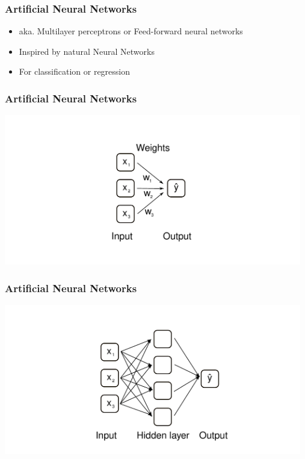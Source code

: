 \documentclass[aspectratio=169]{beamer}
\begin{document}
\begin{frame}
  \begin{block}{}
    \begin{center}
      \frametitle{Artificial Neural Networks}
      \begin{itemize}
      \item aka. Multilayer perceptrons or Feed-forward neural networks
      \item Inspired by natural Neural Networks
      \item For classification or regression
      \end{itemize}
    \end{center}  
  \end{block}  
\end{frame}


\begin{frame}
  \frametitle{Artificial Neural Networks}
  \begin{center}    
    \includegraphics[width=13.0cm]{images/ANN_without_hidden_layer.pdf}
  \end{center}  
\end{frame}

\begin{frame}
  \frametitle{Artificial Neural Networks}
  \begin{center}
    \includegraphics[width=13.0cm]{images/ANN_with_hidden_layer.pdf}
  \end{center}  
\end{frame}
\end{document}

